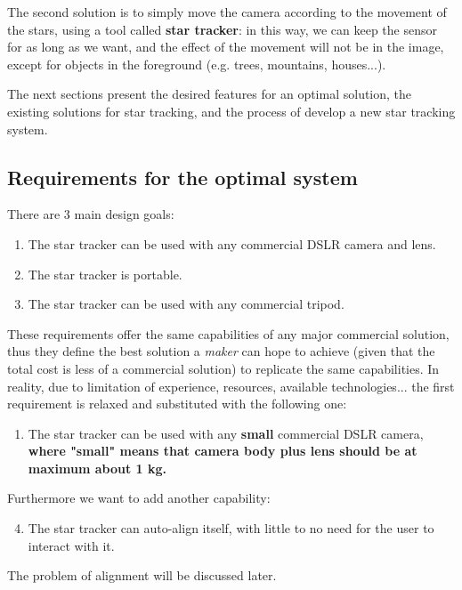 \documentclass[]{article}
\begin{document}
The second solution is to simply move the camera according to the movement of the stars, using a tool called \textbf{star tracker}: in this way, we can keep the sensor for as long as we want, and the effect of the movement will not be in the image, except for objects in the foreground (e.g. trees, mountains, houses...).



The next sections present the desired features for an optimal solution, the existing solutions for star tracking, and the process of develop a new star tracking system.

\subsection{Requirements for the optimal system}

There are 3 main design goals:
\begin{enumerate}
	\item The star tracker can be used with any commercial DSLR camera and lens.
	\item The star tracker is portable.
	\item The star tracker can be used with any commercial tripod.
\end{enumerate}

These requirements offer the same capabilities of any major commercial solution, thus they define the best solution a \textit{maker} can hope to achieve (given that the total cost is less of a commercial solution) to replicate the same capabilities. In reality, due to limitation of experience, resources, available technologies... the first requirement is relaxed and substituted with the following one:
\begin{enumerate}
	\item The star tracker can be used with any \textbf{small} commercial DSLR camera, \textbf{where "small" means that camera body plus lens should be at maximum about 1 kg.}
\end{enumerate}

Furthermore we want to add another capability:


\begin{enumerate}
	\setcounter{enumi}{3}
	\item The star tracker can auto-align itself, with little to no need for the user to interact with it.
\end{enumerate}

The problem of alignment will be discussed later.
\end{document}
